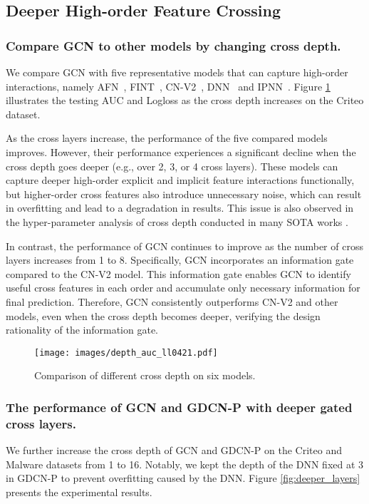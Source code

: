 \documentclass[sigconf]{acmart}
\begin{document}
\subsection{Deeper High-order Feature Crossing}
\label{sec:high_order}


\subsubsection{Compare GCN to other models by changing cross depth.} We compare GCN with five representative models that can capture high-order interactions, namely AFN~\cite{cheng2020adaptive}, FINT~\cite{zhao2021fint}, CN-V2~\cite{wang2021dcnm}, DNN~\cite{zhang2016fnn} and IPNN~\cite{qu2018product}. Figure \ref{fig:depth} illustrates the testing AUC and Logloss as the cross depth increases on the Criteo dataset. 

As the cross layers increase, the performance of the five compared models improves. However, their performance experiences a significant decline when the cross depth goes deeper (e.g., over 2, 3, or 4 cross layers). These models can capture deeper high-order explicit and implicit feature interactions functionally, but higher-order cross features also introduce unnecessary noise, which can result in overfitting and lead to a degradation in results. This issue is also observed in the hyper-parameter analysis of cross depth conducted in many SOTA works \cite{lian2018xdeepfm, cheng2020adaptive, blondel2016higher, song2019autoint, wang2017deep, wang2021dcnm, guo2017deepfm, qu2018product, zhao2021fint, covington2016youtobednn}.


In contrast, the performance of GCN continues to improve as the number of cross layers increases from 1 to 8. Specifically, GCN incorporates an information gate compared to the CN-V2 model. This information gate enables GCN to identify useful cross features in each order and accumulate only necessary information for final prediction. Therefore, GCN consistently outperforms CN-V2 and other models, even when the cross depth becomes deeper, verifying the design rationality of the information gate.


\begin{figure}[t]
\setlength{\abovecaptionskip}{0.2cm}
\setlength{\belowcaptionskip}{-0.2cm}
\centering
\texttt{[image: images/depth\_auc\_ll0421.pdf]}
\caption{Comparison of different cross depth on six models.}
\label{fig:depth}
\end{figure}


\subsubsection{The performance of GCN and GDCN-P with deeper gated cross layers.}
We further increase the cross depth of GCN and GDCN-P on the Criteo and Malware datasets from 1 to 16. Notably, we kept the depth of the DNN fixed at 3 in GDCN-P to prevent overfitting caused by the DNN. Figure \ref{fig:deeper_layers} presents the experimental results.
\end{document}
